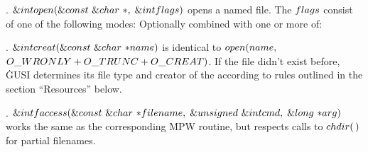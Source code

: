 \fi

. \CD{}$\&{int}\ \\{open}(\&{const}\ \&{char}\ {*},\;\&{int}\ \\{flags})$%
\DC{} opens a named file. The \CD{}$\\{flags}$\DC{} consist
of one of the following modes:
\medskip{}
\medskip Optionally combined with one or more of:
\medskip{}

\fi

. \CD{}$\&{int}\ \\{creat}(\&{const}\ \&{char}\ {*}\\{name})$\DC{} is
identical to \CD{}$\\{open}(\\{name},\;$$\\{O\_WRONLY}+\\{O\_TRUNC}+\\{O%
\_CREAT})$\DC{}.
If the file didn't exist before, \.{GUSI} determines its file type and creator
of the
according to rules outlined in the section ``Resources'' below.

\fi

. \CD{}$\&{int}\ \\{faccess}(\&{const}\ \&{char}\ {*}\\{filename},\;%
\&{unsigned}\ \&{int}\ \\{cmd},\;\&{long}\ {*}\\{arg})$\DC{} works the same
as the corresponding \.{MPW} routine, but respects calls to \CD{}$\\{chdir}(%
\,)$\DC{} for partial
filenames.

